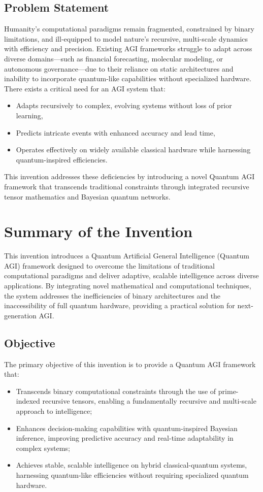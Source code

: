 \documentclass[12pt]{article}
\begin{document}
\subsection{Problem Statement}
Humanity’s computational paradigms remain fragmented, constrained by binary limitations, and ill-equipped to model nature’s recursive, multi-scale dynamics with efficiency and precision. Existing AGI frameworks struggle to adapt across diverse domains—such as financial forecasting, molecular modeling, or autonomous governance—due to their reliance on static architectures and inability to incorporate quantum-like capabilities without specialized hardware. There exists a critical need for an AGI system that:
\begin{itemize}
    \item Adapts recursively to complex, evolving systems without loss of prior learning,
    \item Predicts intricate events with enhanced accuracy and lead time,
    \item Operates effectively on widely available classical hardware while harnessing quantum-inspired efficiencies.
\end{itemize}
This invention addresses these deficiencies by introducing a novel Quantum AGI framework that transcends traditional constraints through integrated recursive tensor mathematics and Bayesian quantum networks.

\section{Summary of the Invention}

This invention introduces a Quantum Artificial General Intelligence (Quantum AGI) framework designed to overcome the limitations of traditional computational paradigms and deliver adaptive, scalable intelligence across diverse applications. By integrating novel mathematical and computational techniques, the system addresses the inefficiencies of binary architectures and the inaccessibility of full quantum hardware, providing a practical solution for next-generation AGI.

\subsection{Objective}
The primary objective of this invention is to provide a Quantum AGI framework that:
\begin{itemize}
    \item Transcends binary computational constraints through the use of prime-indexed recursive tensors, enabling a fundamentally recursive and multi-scale approach to intelligence;
    \item Enhances decision-making capabilities with quantum-inspired Bayesian inference, improving predictive accuracy and real-time adaptability in complex systems;
    \item Achieves stable, scalable intelligence on hybrid classical-quantum systems, harnessing quantum-like efficiencies without requiring specialized quantum hardware.
\end{itemize}
\end{document}
